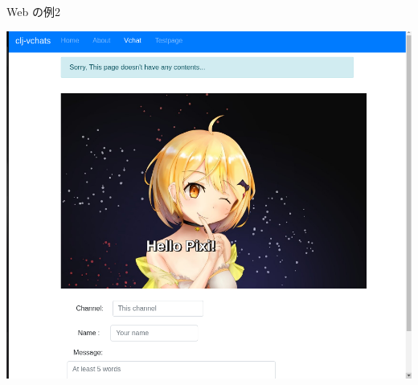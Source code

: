 \documentclass[dvipdfmx,10pt,presentation]{beamer}
\begin{document}
\begin{frame}[allowframebreaks]{Web の例2}
\begin{center}
\includegraphics[width=0.7\linewidth]{./screen2.png}
\end{center}
\end{frame}
\end{document}
